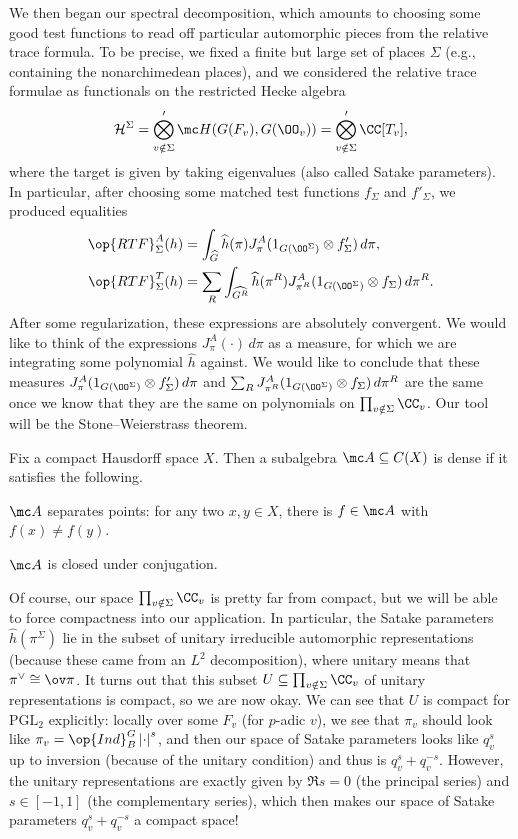 \documentclass[../notes.tex]{subfiles}
\begin{document}
We then began our spectral decomposition, which amounts to choosing some good test functions to read off particular automorphic pieces from the relative trace formula. To be precise, we fixed a finite but large set of places $\Sigma$ (e.g., containing the nonarchimedean places), and we considered the relative trace formulae as functionals on the restricted Hecke algebra
\[\mathcal H^\Sigma=\bigotimes_{v\notin\Sigma}'\mc H(G(F_v),G(\OO_v))=\bigotimes_{v\notin\Sigma}'\CC[T_v],\]
where the target is given by taking eigenvalues (also called Satake parameters). In particular, after choosing some matched test functions $f_\Sigma$ and $f'_\Sigma$, we produced equalities
\begin{align*}
	\op{RTF}^A_\Sigma(h) &= \int_{\widehat G} \widehat h(\pi)J_\pi^A(1_{G(\OO^\Sigma)}\otimes f_\Sigma')\,d\pi, \\
	\op{RTF}^T_{\Sigma}(h) &= \sum_R\int_{\widehat{G^R}}\widehat h(\pi^R)J^A_{\pi^R}(1_{G(\OO^\Sigma)}\otimes f_\Sigma)\,d\pi^R.
\end{align*}
After some regularization, these expressions are absolutely convergent. We would like to think of the expressions $J_\pi^A(\cdot)\,d\pi$ as a measure, for which we are integrating some polynomial $\widehat h$ against. We would like to conclude that these measures $J_\pi^A(1_{G(\OO^\Sigma)}\otimes f_\Sigma')\,d\pi$ and $\sum_RJ_{\pi^R}^A(1_{G(\OO^\Sigma)}\otimes f_\Sigma)\,d\pi^R$ are the same once we know that they are the same on polynomials on $\prod_{v\notin\Sigma}\CC_v$. Our tool will be the Stone--Weierstrass theorem.
\begin{theorem} \label{thm:stone-weier}
	Fix a compact Hausdorff space $X$. Then a subalgebra $\mc A\subseteq C(X)$ is dense if it satisfies the following.
	\begin{listalph}
		\item $\mc A$ separates points: for any two $x,y\in X$, there is $f\in\mc A$ with $f(x)\ne f(y)$.
		\item $\mc A$ is closed under conjugation.
	\end{listalph}
\end{theorem}
Of course, our space $\prod_{v\notin\Sigma}\CC_v$ is pretty far from compact, but we will be able to force compactness into our application. In particular, the Satake parameters $\widehat h(\pi^\Sigma)$ lie in the subset of unitary irreducible automorphic representations (because these came from an $L^2$ decomposition), where unitary means that $\pi^\lor\cong\ov\pi$. It turns out that this subset $U\subseteq\prod_{v\notin\Sigma}\CC_v$ of unitary representations is compact, so we are now okay. We can see that $U$ is compact for $\mathrm{PGL}_2$ explicitly: locally over some $F_v$ (for $p$-adic $v$), we see that $\pi_v$ should look like $\pi_v=\op{Ind}_B^G\left|\cdot\right|^s$, and then our space of Satake parameters looks like $q_v^s$ up to inversion (because of the unitary condition) and thus is $q_v^s+q_v^{-s}$. However, the unitary representations are exactly given by $\Re s=0$ (the principal series) and $s\in[-1,1]$ (the complementary series), which then makes our space of Satake parameters $q_v^s+q_v^{-s}$ a compact space!
\end{document}
